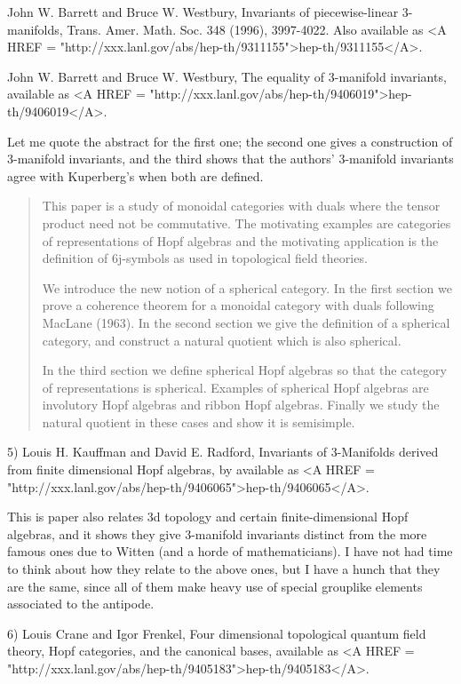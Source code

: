John W. Barrett and Bruce W. Westbury, 
Invariants of piecewise-linear 3-manifolds, 
Trans. Amer. Math. Soc. 348 (1996), 3997-4022.  Also 
available
as <A HREF = "http://xxx.lanl.gov/abs/hep-th/9311155">hep-th/9311155</A>.

John W. Barrett and Bruce W. Westbury, 
The equality of 3-manifold invariants, 
available as
<A HREF = "http://xxx.lanl.gov/abs/hep-th/9406019">hep-th/9406019</A>.

Let me quote the abstract for the first one; the second one gives 
a construction of 3-manifold invariants, and the third shows that 
the authors' 3-manifold invariants agree with Kuperberg's when both
are defined.

\begin{quote}

This paper is a study of monoidal categories with duals where the
tensor product need not be commutative. The motivating examples are
categories of representations of Hopf algebras and the motivating
application is the definition of 6j-symbols as used in topological field
theories.

We introduce the new notion of a spherical category.  In the first
section we prove a coherence theorem for a monoidal category with duals
following MacLane (1963).  In the second section we give the definition
of a spherical category, and construct a natural quotient which is also
spherical.

In the third section we define spherical Hopf algebras so that the
category of representations is spherical. Examples of spherical Hopf
algebras are involutory Hopf algebras and ribbon Hopf algebras. Finally
we study the natural quotient in these cases and show it is semisimple.

\end{quote}

5) Louis H. Kauffman and David E. Radford, 
Invariants of 3-Manifolds derived from finite dimensional Hopf algebras, by
available as
<A HREF = "http://xxx.lanl.gov/abs/hep-th/9406065">hep-th/9406065</A>. 

This is paper also relates 3d topology and certain finite-dimensional
Hopf algebras, and it shows they give 3-manifold invariants distinct
from the more famous ones due to Witten (and a horde of mathematicians).
I have not had time to think about how they relate to the above ones,
but I have a hunch that they are the same, since all of them make heavy
use of special grouplike elements associated to the antipode.  

6) Louis Crane and Igor Frenkel, 
Four dimensional topological quantum field theory, Hopf categories,
and the canonical bases, 
available as
<A HREF = "http://xxx.lanl.gov/abs/hep-th/9405183">hep-th/9405183</A>.   

